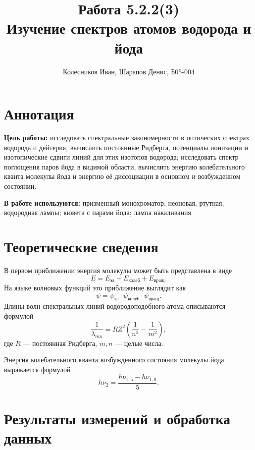 \documentclass[a4paper]{article}
\title{Работа 5.2.2(3) \\ Изучение спектров атомов водорода и йода}
\author{Колесников Иван, Шарапов Денис, Б05-004}
\date{}
\begin{document}
    \maketitle
    \tableofcontents
    \newpage
    
\section{Аннотация}

\noindent\textbf{Цель работы:} исследовать спектральные закономерности в оптических спектрах водорода и дейтерия, вычислить постоянные Ридберга, потенциалы ионизации и изотопические сдвиги линий для этих изотопов водорода; исследовать спектр поглощения паров йода в видимой области, вычислить энергию колебательного кванта молекулы йода и энергию её диссоциации в основном и возбужденном состоянии. \smallskip
 
\noindent \textbf{В работе используются:} призменный монохроматор; неоновая, ртутная, водородная лампы; кювета с парами йода; лампа накаливания.

\section{Теоретические сведения}
В первом приближении энергия молекулы может быть представлена в виде
\begin{equation}
    E = E_{\text{эл}} + E_{\text{колеб}} + E_{\text{вращ}}.
\end{equation}
На языке волновых функций это приближение выглядит как
\begin{equation}
    \psi = \psi_{{\text{эл}}} \cdot \psi_{\text{колеб}} \cdot \psi_{\text{вращ}}.
\end{equation}
Длины волн спектральных линий водородоподобного атома описываются формулой
\begin{equation}
    \frac{1}{\lambda_{mn}} = RZ^2 \left( \frac{1}{n^2} - \frac{1}{m^2} \right), 
\end{equation}
где $R$ --- постоянная Ридберга, $m, n$ --- целые числа. \medskip

\noindent Энергия колебательного кванта возбужденного состояния молекулы йода выражается формулой
\begin{equation}
    h\nu_2 = \frac{h\nu_{1,5} - h\nu_{1,0}}{5}.
\end{equation}

\section{Результаты измерений и обработка данных}
\end{document}
